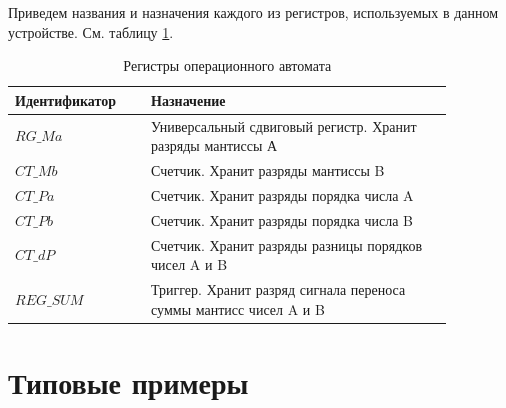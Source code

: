 \documentclass[a4paper,14pt]{extarticle}
\begin{document}
Приведем названия и назначения каждого из регистров, используемых в данном устройстве. См. таблицу \ref{tab:course_op2_regs}.
\begin{table}[h!]
	\centering
	\small
	\begin{tabular}{|m{0.27\linewidth}|m{0.6\linewidth}|}
		\hline
		\textbf{Идентификатор} & \textbf{Назначение} \\ \hline
		$RG\_Ma$ & Универсальный сдвиговый регистр. Хранит разряды мантиссы А\\ \hline
		$CT\_Mb$ & Счетчик. Хранит разряды мантиссы B\\ \hline
		$CT\_Pa$ & Счетчик. Хранит разряды порядка числа A \\\hline
		$CT\_Pb$ & Счетчик. Хранит разряды порядка числа B \\ \hline
		$CT\_dP$ & Счетчик. Хранит разряды разницы порядков чисел A и B\\ \hline
		$REG\_SUM$& Триггер. Хранит разряд сигнала переноса суммы мантисс чисел A и B\\\hline
	\end{tabular}
	\caption{Регистры операционного автомата}
	\label{tab:course_op2_regs}
\end{table}


\section{Типовые примеры}
\end{document}
